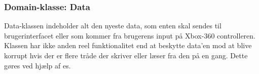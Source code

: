 \subsubsection{Domain-klasse: Data} \label{sec:data_klasse}

Data-klassen indeholder alt den nyeste data, som enten skal sendes til brugerinterfacet eller som kommer fra brugerens input på Xbox-360 controlleren. Klassen har ikke anden reel funktionalitet end at beskytte data'en mod at blive korrupt hvis der er flere tråde der skriver eller læser fra den på en gang. Dette gøres ved hjælp af es.